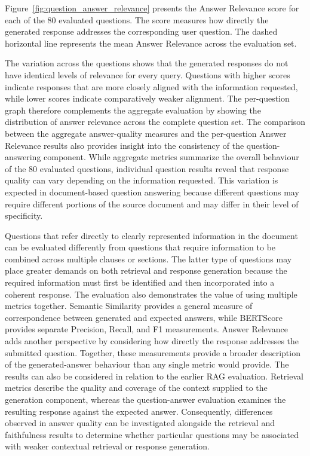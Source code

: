 \documentclass[12pt,a4paper,oneside]{report}
\begin{document}
Figure~\ref{fig:question_answer_relevance} presents the Answer Relevance score for each of the 80 evaluated questions. The score measures how directly the generated response addresses the corresponding user question. The dashed horizontal line represents the mean Answer Relevance across the evaluation set.

The variation across the questions shows that the generated responses do not have identical levels of relevance for every query. Questions with higher scores indicate responses that are more closely aligned with the information requested, while lower scores indicate comparatively weaker alignment. The per-question graph therefore complements the aggregate evaluation by showing the distribution of answer relevance across the complete question set. The comparison between the aggregate answer-quality measures and the per-question Answer Relevance results also provides insight into the consistency of the question-answering component. While aggregate metrics summarize the overall behaviour of the 80 evaluated questions, individual question results reveal that response quality can vary depending on the information requested. This variation is expected in document-based question answering because different questions may require different portions of the source document and may differ in their level of specificity.

Questions that refer directly to clearly represented information in the document can be evaluated differently from questions that require information to be combined across multiple clauses or sections. The latter type of questions may place greater demands on both retrieval and response generation because the required information must first be identified and then incorporated into a coherent response. The evaluation also demonstrates the value of using multiple metrics together. Semantic Similarity provides a general measure of correspondence between generated and expected answers, while BERTScore provides separate Precision, Recall, and F1 measurements. Answer Relevance adds another perspective by considering how directly the response addresses the submitted question. Together, these measurements provide a broader description of the generated-answer behaviour than any single metric would provide. The results can also be considered in relation to the earlier RAG evaluation. Retrieval metrics describe the quality and coverage of the context supplied to the generation component, whereas the question-answer evaluation examines the resulting response against the expected answer. Consequently, differences observed in answer quality can be investigated alongside the retrieval and faithfulness results to determine whether particular questions may be associated with weaker contextual retrieval or response generation.
\end{document}
